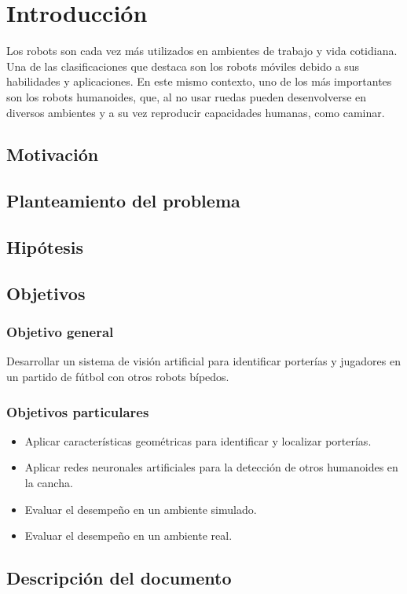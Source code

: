 \chapter{Introducción}
 Los robots son cada vez más utilizados en ambientes de trabajo y vida cotidiana.\cite{sadangharn2022acceptance} Una de las clasificaciones que destaca son los robots móviles debido a sus habilidades y aplicaciones. En este mismo contexto, uno de los más importantes son los robots humanoides, que, al no usar ruedas pueden desenvolverse en diversos ambientes y a su vez reproducir capacidades humanas, como caminar. \cite{rubio2019review} 
\section{Motivación}
\section{Planteamiento del problema}
\section{Hipótesis}

\section{Objetivos}
\subsection*{Objetivo general}
Desarrollar un sistema de visión artificial para identificar porterías y jugadores en un partido de fútbol con otros robots bípedos.
\subsection*{Objetivos particulares}
\begin{itemize}
    \item Aplicar características geométricas para identificar y localizar porterías.
    \item Aplicar redes neuronales artificiales para la detección de otros humanoides en la cancha.
    \item Evaluar el desempeño en un ambiente simulado.
    \item Evaluar el desempeño en un ambiente real.
\end{itemize}
\section{Descripción del documento}
